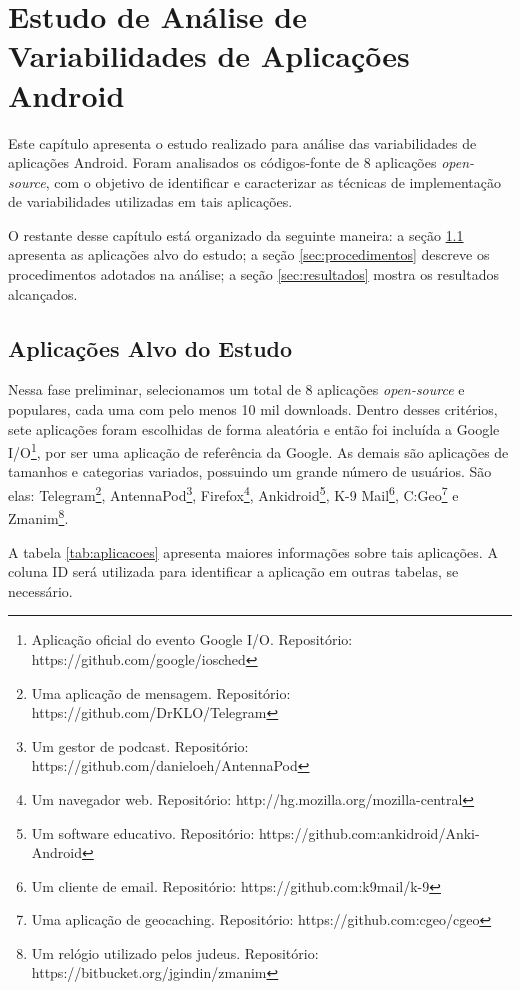 \chapter{Estudo de Análise de Variabilidades de Aplicações Android}

Este capítulo apresenta  o estudo realizado para análise das variabilidades de
aplicações Android. Foram analisados os códigos-fonte de 8 aplicações \textit{open-source},
com o objetivo de identificar e caracterizar as técnicas de implementação de
variabilidades utilizadas em tais aplicações.

O restante desse capítulo está organizado da seguinte maneira: a seção \ref{sec:aplicacoes}
apresenta as aplicações alvo do estudo;  a seção \ref{sec:procedimentos} descreve
os procedimentos adotados na análise; a seção \ref{sec:resultados} mostra os resultados alcançados. 


\section{Aplicações Alvo do Estudo}
\label{sec:aplicacoes}

Nessa fase preliminar, selecionamos um total de 8 aplicações \textit{open-source}
e populares, cada uma com pelo menos 10 mil downloads. Dentro desses critérios,
sete aplicações foram escolhidas de forma aleatória e então foi incluída a
Google I/O\footnote{Aplicação oficial do evento Google I/O. Repositório: https://github.com/google/iosched},
por ser uma aplicação de referência da Google. As demais são aplicações de tamanhos
e categorias variados, possuindo um grande número de usuários. São elas:
Telegram\footnote{Uma aplicação de mensagem. Repositório: https://github.com/DrKLO/Telegram},
AntennaPod\footnote{Um gestor de podcast. Repositório: https://github.com/danieloeh/AntennaPod},
Firefox\footnote{Um navegador web. Repositório: http://hg.mozilla.org/mozilla-central},
Ankidroid\footnote{Um software educativo. Repositório: https://github.com:ankidroid/Anki-Android},
K-9 Mail\footnote{Um cliente de email. Repositório: https://github.com:k9mail/k-9},
C:Geo\footnote{Uma aplicação de geocaching. Repositório: https://github.com:cgeo/cgeo}
e Zmanim\footnote{Um relógio utilizado pelos judeus. Repositório: https://bitbucket.org/jgindin/zmanim}. 

A tabela \ref{tab:aplicacoes}
apresenta maiores informações sobre tais aplicações.
A coluna ID será utilizada para identificar a aplicação em outras tabelas, se necessário.

